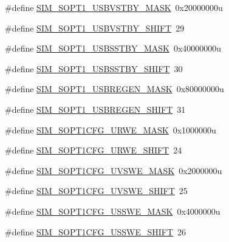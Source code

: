 \begin{DoxyCompactItemize}
\item 
\#define \hyperlink{group___s_i_m___register___masks_gaaf0b406e4bd1800083f48727a7cde829}{S\+I\+M\+\_\+\+S\+O\+P\+T1\+\_\+\+U\+S\+B\+V\+S\+T\+B\+Y\+\_\+\+M\+A\+SK}~0x20000000u
\item 
\#define \hyperlink{group___s_i_m___register___masks_gae945165e21faf14e58288bce0918482a}{S\+I\+M\+\_\+\+S\+O\+P\+T1\+\_\+\+U\+S\+B\+V\+S\+T\+B\+Y\+\_\+\+S\+H\+I\+FT}~29
\item 
\#define \hyperlink{group___s_i_m___register___masks_ga93a808f7a1d75e26bc3ed565ab257617}{S\+I\+M\+\_\+\+S\+O\+P\+T1\+\_\+\+U\+S\+B\+S\+S\+T\+B\+Y\+\_\+\+M\+A\+SK}~0x40000000u
\item 
\#define \hyperlink{group___s_i_m___register___masks_ga8a24334d1be5bd01017bd364dd53f268}{S\+I\+M\+\_\+\+S\+O\+P\+T1\+\_\+\+U\+S\+B\+S\+S\+T\+B\+Y\+\_\+\+S\+H\+I\+FT}~30
\item 
\#define \hyperlink{group___s_i_m___register___masks_gac60c367119b3dcc752c4cf857b8a59b5}{S\+I\+M\+\_\+\+S\+O\+P\+T1\+\_\+\+U\+S\+B\+R\+E\+G\+E\+N\+\_\+\+M\+A\+SK}~0x80000000u
\item 
\#define \hyperlink{group___s_i_m___register___masks_ga99e46c34c02e39338c9b80775bad09db}{S\+I\+M\+\_\+\+S\+O\+P\+T1\+\_\+\+U\+S\+B\+R\+E\+G\+E\+N\+\_\+\+S\+H\+I\+FT}~31
\item 
\#define \hyperlink{group___s_i_m___register___masks_gaa4e1ee8f60c8c15ad553c2dfb82c2039}{S\+I\+M\+\_\+\+S\+O\+P\+T1\+C\+F\+G\+\_\+\+U\+R\+W\+E\+\_\+\+M\+A\+SK}~0x1000000u
\item 
\#define \hyperlink{group___s_i_m___register___masks_ga07bf2ffc61aacca96748747fa8df7062}{S\+I\+M\+\_\+\+S\+O\+P\+T1\+C\+F\+G\+\_\+\+U\+R\+W\+E\+\_\+\+S\+H\+I\+FT}~24
\item 
\#define \hyperlink{group___s_i_m___register___masks_ga29e593e134a31bed2dbd3673c51cb330}{S\+I\+M\+\_\+\+S\+O\+P\+T1\+C\+F\+G\+\_\+\+U\+V\+S\+W\+E\+\_\+\+M\+A\+SK}~0x2000000u
\item 
\#define \hyperlink{group___s_i_m___register___masks_ga74d94a9794e03091f54b76a5c18c58b8}{S\+I\+M\+\_\+\+S\+O\+P\+T1\+C\+F\+G\+\_\+\+U\+V\+S\+W\+E\+\_\+\+S\+H\+I\+FT}~25
\item 
\#define \hyperlink{group___s_i_m___register___masks_ga0b7d9fe471d5d689ba3feb001cf69b60}{S\+I\+M\+\_\+\+S\+O\+P\+T1\+C\+F\+G\+\_\+\+U\+S\+S\+W\+E\+\_\+\+M\+A\+SK}~0x4000000u
\item 
\#define \hyperlink{group___s_i_m___register___masks_ga6984c7260abd4b7caccff970332eb4be}{S\+I\+M\+\_\+\+S\+O\+P\+T1\+C\+F\+G\+\_\+\+U\+S\+S\+W\+E\+\_\+\+S\+H\+I\+FT}~26

\end{DoxyCompactItemize}
